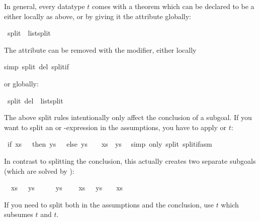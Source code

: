 \begin{isabellebody}
\begin{isamarkuptext}
In general, every datatype $t$ comes with a theorem
 which can be declared to be a  either
locally as above, or by giving it the  attribute globally:%
\end{isamarkuptext}%
\ {\isacharbrackleft}split{\isacharbrackright}\ {\isacharequal}\ list{\isachardot}split%
\begin{isamarkuptext}%
\noindent
The  attribute can be removed with the  modifier,
either locally%
\end{isamarkuptext}%
simp\ split\ del{\isacharcolon}\ split{\isacharunderscore}if{\isacharparenright}%
\begin{isamarkuptext}%
\noindent
or globally:%
\end{isamarkuptext}%
\ {\isacharbrackleft}split\ del{\isacharbrackright}\ {\isacharequal}\ list{\isachardot}split%
\begin{isamarkuptext}%
The above split rules intentionally only affect the conclusion of a
subgoal.  If you want to split an  or -expression in
the assumptions, you have to apply  or $t$:%
\end{isamarkuptext}%
\ {\isachardoublequote}if\ xs\ {\isacharequal}\ {\isacharbrackleft}{\isacharbrackright}\ then\ ys\ {\isachartilde}{\isacharequal}\ {\isacharbrackleft}{\isacharbrackright}\ else\ ys\ {\isacharequal}\ {\isacharbrackleft}{\isacharbrackright}\ {\isacharequal}{\isacharequal}{\isachargreater}\ xs\ {\isacharat}\ ys\ {\isachartilde}{\isacharequal}\ {\isacharbrackleft}{\isacharbrackright}{\isachardoublequote}\isanewline
{}simp\ only{\isacharcolon}\ split{\isacharcolon}\ split{\isacharunderscore}if{\isacharunderscore}asm{\isacharparenright}%
\begin{isamarkuptxt}%
\noindent
In contrast to splitting the conclusion, this actually creates two
separate subgoals (which are solved by ):
\begin{isabelle}
\ \ {\isasymlbrakk}\mbox{xs}\ {\isacharequal}\ {\isacharbrackleft}{\isacharbrackright}{\isacharsemicolon}\ \mbox{ys}\ {\isasymnoteq}\ {\isacharbrackleft}{\isacharbrackright}{\isasymrbrakk}\ {\isasymLongrightarrow}\ {\isacharbrackleft}{\isacharbrackright}\ {\isacharat}\ \mbox{ys}\ {\isasymnoteq}\ {\isacharbrackleft}{\isacharbrackright}\isanewline
\ \ {\isasymlbrakk}\mbox{xs}\ {\isasymnoteq}\ {\isacharbrackleft}{\isacharbrackright}{\isacharsemicolon}\ \mbox{ys}\ {\isacharequal}\ {\isacharbrackleft}{\isacharbrackright}{\isasymrbrakk}\ {\isasymLongrightarrow}\ \mbox{xs}\ {\isacharat}\ {\isacharbrackleft}{\isacharbrackright}\ {\isasymnoteq}\ {\isacharbrackleft}{\isacharbrackright}
\end{isabelle}
If you need to split both in the assumptions and the conclusion,
use $t$ which subsumes $t$ and $t$.%
\end{isamarkuptxt}%
\end{isabellebody}%
